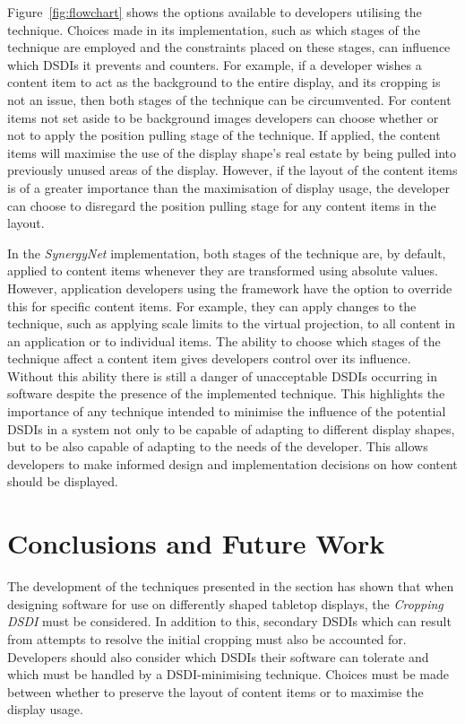 \documentclass{bmcart}
\begin{document}
Figure~\ref{fig:flowchart} shows the options available to developers utilising the technique.
Choices made in its implementation, such as which stages of the technique are employed and the constraints placed on these stages, can influence which \acp{DSDI} it prevents and counters.
For example, if a developer wishes a content item to act as the background to the entire display, and its cropping is not an issue, then both stages of the technique can be circumvented.
For content items not set aside to be background images developers can choose whether or not to apply the position pulling stage of the technique.
If applied, the content items will maximise the use of the display shape's real estate by being pulled into previously unused areas of the display.
However, if the layout of the content items is of a greater importance than the maximisation of display usage, the developer can choose to disregard the position pulling stage for any content items in the layout.

In the {\emph{SynergyNet}} implementation, both stages of the technique are, by default, applied to content items whenever they are transformed using absolute values.
However, application developers using the framework have the option to override this for specific content items.
For example, they can apply changes to the technique, such as applying scale limits to the virtual projection, to all content in an application or to individual items.
The ability to choose which stages of the technique affect a content item gives developers control over its influence.
Without this ability there is still a danger of unacceptable \acp{DSDI} occurring in software despite the presence of the implemented technique.
This highlights the importance of any technique intended to minimise the influence of the potential \acp{DSDI} in a system not only to be capable of adapting to different display shapes, but to be also capable of adapting to the needs of the developer. 
This allows developers to make informed design and implementation decisions on how content should be displayed.

\section*{Conclusions and Future Work}
\label{sec:conclusion}

The development of the techniques presented in the  section has shown that when designing software for use on differently shaped tabletop displays, the {\emph{Cropping \ac{DSDI}}} must be considered.
In addition to this, secondary \acp{DSDI} which can result from attempts to resolve the initial cropping must also be accounted for.
Developers should also consider which \acp{DSDI} their software can tolerate and which must be handled by a \ac{DSDI}-minimising technique.
Choices must be made between whether to preserve the layout of content items or to maximise the display usage.
\end{document}
